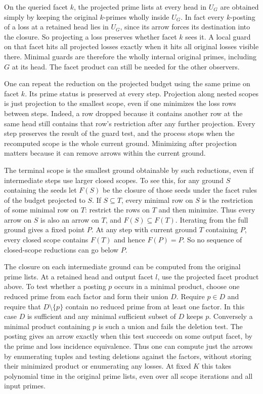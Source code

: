 On the queried facet $k$, the projected prime lists
at every head in $U_G$ are obtained simply by keeping
the original $k$-primes wholly inside $U_G$. In fact
every $k$-posting of a loss at a retained head lies
in $U_G$, since its arrow forces its destination
into the closure. So projecting a loss preserves
whether facet $k$ sees it. A local guard on that
facet hits all projected losses exactly when it
hits all original losses visible there. Minimal
guards are therefore the wholly internal original
primes, including $G$ at its head. The facet product
can still be needed for the other observers.

One can repeat the reduction on the projected budget
using the same prime on facet $k$. Its prime status
is preserved at every step. Projection along nested
scopes is just projection to the smallest scope,
even if one minimizes the loss rows between steps.
Indeed, a row dropped because it contains another
row at the same head still contains that row's
restriction after any further projection. Every
step preserves the result of the guard test, and
the process stops when the recomputed scope is the
whole current ground. Minimizing after projection
matters because it can remove arrows within the
current ground.

The terminal scope is the smallest ground obtainable
by such reductions, even if intermediate steps use
larger closed scopes. To see this, for any ground
$S$ containing the seeds let $F(S)$ be the closure
of those seeds under the facet rules of the budget
projected to $S$. If $S\subseteq T$, every minimal
row on $S$ is the restriction of some minimal row
on $T$: restrict the rows on $T$ and then minimize.
Thus every arrow on $S$ is also an arrow on $T$,
and $F(S)\subseteq F(T)$. Iterating from the full
ground gives a fixed point $P$. At any step with
current ground $T$ containing $P$, every closed
scope contains $F(T)$ and hence $F(P)=P$. So no
sequence of closed-scope reductions can go below
$P$.

The closure on each intermediate ground can be
computed from the original prime lists. At a
retained head and output facet $l$, use the
projected facet product above. To test whether a
posting $p$ occurs in a minimal product, choose
one reduced prime from each factor and form
their union $D$. Require $p\in D$ and require that
$D\setminus\{p\}$ contain no reduced prime from
at least one factor. In this case $D$ is sufficient
and any minimal sufficient subset of $D$ keeps
$p$. Conversely a minimal product containing $p$
is such a union and fails the deletion test.
The posting gives an arrow exactly when this
test succeeds on some output facet, by the
prime and loss incidence equivalence. Thus one
can compute just the arrows by enumerating
tuples and testing deletions against the factors,
without storing their minimized product or
enumerating any losses. At fixed $K$ this takes
polynomial time in the original prime lists,
even over all scope iterations and all input
primes.

